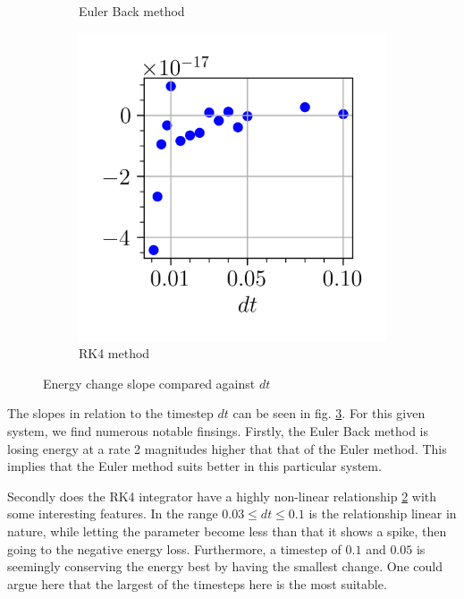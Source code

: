 \begin{figure}[!ht]
\begin{subfigure}[b]{0.3\textwidth}
	\caption{Euler Back method}
	\label{fig:energy_cons_euler_backward}
	\end{subfigure}
	\hfill
	\begin{subfigure}[b]{0.3\textwidth}
	\centering
	\includegraphics[width=1.0\textwidth]{figures/energy_conservation_rk4}
	\caption{RK4 method}
	\label{fig:energy_cons_rk4}
	\end{subfigure}	
	
	\caption{}Energy change slope compared against $dt$
	\label{fig:slopes-dt}
\end{figure}


The slopes in relation to the timestep $dt$ can be seen in fig. \ref{fig:slopes-dt}. For this given system, we find numerous notable finsings. Firstly, the Euler Back method is losing energy at a rate 2 magnitudes higher that that of the Euler method. This implies that the Euler method suits better in this particular system. 

Secondly does the RK4 integrator have a highly non-linear relationship \ref{fig:energy_cons_rk4} with some interesting features. In the range $0.03 \leq dt \leq 0.1$ is the relationship linear in nature, while letting the parameter become less than that it shows a spike, then going to the negative energy loss. Furthermore, a timestep of $0.1$ and $0.05$ is seemingly conserving the energy best by having the smallest change. One could argue here that the largest of the timesteps here is the most suitable.  

